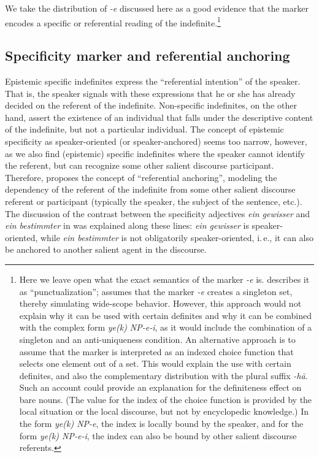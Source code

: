 \documentclass[output=paper]{langsci/langscibook}
\begin{document}
We take the distribution of {\emph{-e}} discussed here as a good evidence that the marker encodes a specific or referential reading of the indefinite.\footnote{{Here we leave open what the exact semantics of the marker {\emph{-e}} is. \cite[][176]{hincha:61} describes it as ``punctualization''; \cite{jasbi:20b} assumes that the marker {\emph{-e}} creates a singleton set, thereby simulating wide-scope behavior. However, this approach would not explain why it can be used with certain definites and why it can be combined with the complex form {\emph{ye(k) NP-e-i}}, as it would include the combination of a singleton and an anti-uniqueness condition. An alternative approach is to assume that the marker is interpreted as an indexed choice function \citep{egli:vonheus:95,winter:97} that selects one element out of a set. This would explain the use with certain definites, and also the complementary distribution with the plural suffix {\emph{-hā}}. Such an account could provide an explanation for the definiteness effect on bare nouns. (The value for the index of the choice function is provided by the local situation or the local discourse, but not by encyclopedic knowledge.) In the form {\emph{ye(k) NP-e}}, the index is locally bound by the speaker, and for the form {\emph{ye(k) NP-e-i}}, the index can also be bound by other salient discourse referents.}}


\subsection{Specificity marker and referential anchoring}\label{4sec:43}

{
Epistemic specific indefinites express the ``referential intention'' of the speaker. That is, the speaker signals with these expressions that he or she has already decided on the referent of the indefinite. Non-specific indefinites, on the other hand, assert the existence of an individual that falls under the descriptive content of the indefinite, but not a particular individual. The concept of epistemic specificity as speaker-oriented (or speaker-anchored) seems too narrow, however, as we also find (epistemic) specific indefinites where the speaker cannot identify the referent, but can recognize some other salient discourse participant. Therefore, \cite{vonheus:02url,vonheus:19} proposes the concept of ``referential anchoring'', modeling the dependency of the referent of the indefinite from some other salient discourse referent or participant (typically the speaker, the subject of the sentence, etc.). The discussion of the contrast between the specificity adjectives {\emph{ein gewisser}} and {\emph{ein bestimmter}} in  was explained along these lines: {\emph{ein gewisser}} is speaker-oriented, while {\emph{ein bestimmter}} is not obligatorily speaker-oriented, i.\,e., it can also be anchored to another salient agent in the discourse.
}
\end{document}
